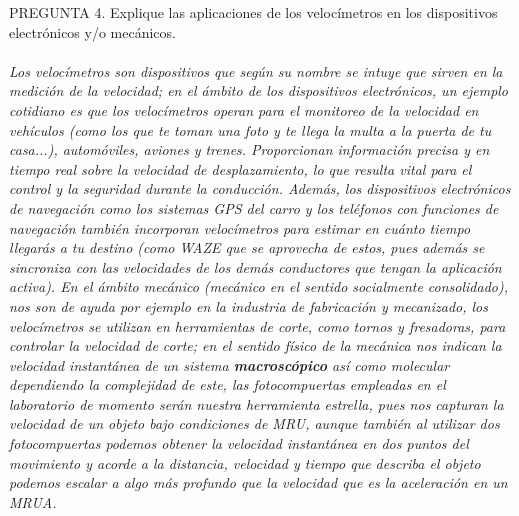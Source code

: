 \documentclass{article}
\begin{document}
PREGUNTA 4. Explique las aplicaciones de los velocímetros en los dispositivos electrónicos y/o mecánicos. \\\\
\textit{Los velocímetros son dispositivos que según su nombre se intuye que sirven en la medición de la velocidad; en el ámbito de los dispositivos electrónicos, un ejemplo cotidiano es que los velocímetros operan para el monitoreo de la velocidad en vehículos (como los que te toman una foto y te llega la multa a la puerta de tu casa...), automóviles, aviones y trenes. Proporcionan información precisa y en tiempo real sobre la velocidad de desplazamiento, lo que resulta vital para el control y la seguridad durante la conducción. Además, los dispositivos electrónicos de navegación como los sistemas GPS del carro y los teléfonos con funciones de navegación también incorporan velocímetros para estimar en cuánto tiempo llegarás a tu destino (como WAZE que se aprovecha de estos, pues además se sincroniza con las velocidades de los demás conductores que tengan la aplicación activa). En el ámbito mecánico (mecánico en el sentido socialmente consolidado), nos son de ayuda por ejemplo en la industria de fabricación y mecanizado, los velocímetros se utilizan en herramientas de corte, como tornos y fresadoras, para controlar la velocidad de corte; en el sentido físico de la mecánica nos indican la velocidad instantánea de un sistema \textbf{macroscópico} así como molecular dependiendo la complejidad de este, las fotocompuertas empleadas en el laboratorio de momento serán nuestra herramienta estrella, pues nos capturan la velocidad de un objeto bajo condiciones de MRU, aunque también al utilizar dos fotocompuertas podemos obtener la velocidad instantánea en dos puntos del movimiento y acorde a la distancia, velocidad y tiempo que describa el objeto podemos escalar a algo más profundo que la velocidad que es la aceleración en un MRUA.}
\\\\
\end{document}
